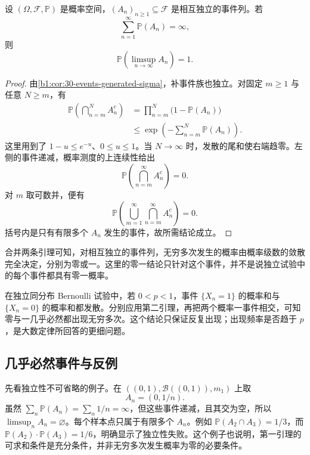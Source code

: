 \begin{lemma}\label{b1:lem:30-borel-cantelli-second}
设 \((\Omega,\mathcal F,\mathbb P)\) 是概率空间，\((A_n)_{n\geq1}\subseteq\mathcal F\) 是相互独立的事件列。若
\[
 \sum_{n=1}^{\infty}\mathbb P(A_n)=\infty,
\]
则
\[
 \mathbb P\left(\limsup_{n\to\infty}A_n\right)=1.
\]
\end{lemma}
\begin{proof}
由\cref{b1:cor:30-events-generated-sigma}，补事件族也独立。对固定 \(m\geq1\) 与任意 \(N\geq m\)，有
\[
 \begin{aligned}
 \mathbb P\left(\bigcap_{n=m}^NA_n^c\right)
 &=\prod_{n=m}^N\bigl(1-\mathbb P(A_n)\bigr)\\
 &\leq\exp\left(-\sum_{n=m}^N\mathbb P(A_n)\right).
 \end{aligned}
\]
这里用到了 \(1-u\leq e^{-u}\)、\(0\leq u\leq1\)。当 \(N\to\infty\) 时，发散的尾和使右端趋零。左侧的事件递减，概率测度的上连续性给出
\[
 \mathbb P\left(\bigcap_{n=m}^{\infty}A_n^c\right)=0.
\]
对 \(m\) 取可数并，便有
\[
 \mathbb P\left(\bigcup_{m=1}^{\infty}\bigcap_{n=m}^{\infty}A_n^c\right)=0.
\]
括号内是只有有限多个 \(A_n\) 发生的事件，故所需结论成立。
\end{proof}

合并两条引理可知，对相互独立的事件列，无穷多次发生的概率由概率级数的敛散完全决定，分别为零或一。这里的零一结论只针对这个事件，并不是说独立试验中的每个事件都具有零一概率。

\ProseParagraphBreak

在独立同分布 Bernoulli 试验中，若 \(0<p<1\)，事件 \(\{X_n=1\}\) 的概率和与 \(\{X_n=0\}\) 的概率和都发散。分别应用第二引理，再把两个概率一事件相交，可知零与一几乎必然都出现无穷多次。这个结论只保证反复出现；出现频率是否趋于 \(p\)，是大数定律所回答的更细问题。

\subsection{几乎必然事件与反例}
\label{b1:subsec:300304}

先看独立性不可省略的例子。在 \(((0,1),\mathcal B((0,1)),m_1)\) 上取
\[
 A_n=(0,1/n).
\]
虽然 \(\sum_n\mathbb P(A_n)=\sum_n1/n=\infty\)，但这些事件递减，且其交为空，所以 \(\limsup_nA_n=\varnothing\)。每个样本点只属于有限多个 \(A_n\)。例如 \(\mathbb P(A_2\cap A_3)=1/3\)，而 \(\mathbb P(A_2)\cdot\mathbb P(A_3)=1/6\)，明确显示了独立性失败。这个例子也说明，第一引理的可求和条件是充分条件，并非无穷多次发生概率为零的必要条件。

\ProseParagraphBreak

